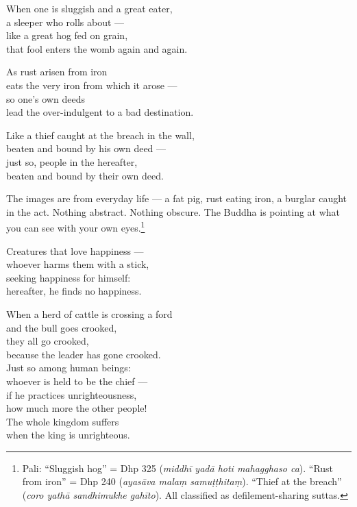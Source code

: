 \begin{versebox}
When one is sluggish and a great eater,\\
a sleeper who rolls about ---\\
like a great hog fed on grain,\\
that fool enters the womb again and again.
\end{versebox}

\begin{versebox}
As rust arisen from iron\\
eats the very iron from which it arose ---\\
so one's own deeds\\
lead the over-indulgent to a bad destination.
\end{versebox}

\begin{versebox}
Like a thief caught at the breach in the wall,\\
beaten and bound by his own deed ---\\
just so, people in the hereafter,\\
beaten and bound by their own deed.
\end{versebox}

\noindent The images are from everyday life --- a fat pig, rust eating iron, a burglar caught in the act. Nothing abstract. Nothing obscure. The Buddha is pointing at what you can see with your own eyes.\footnote{Pali: ``Sluggish hog'' = Dhp 325 (\textit{middhī yadā hoti mahagghaso ca}). ``Rust from iron'' = Dhp 240 (\textit{ayasāva malaṃ samuṭṭhitaṃ}). ``Thief at the breach'' (\textit{coro yathā sandhimukhe gahīto}). All classified as defilement-sharing suttas.}

\begin{versebox}
Creatures that love happiness ---\\
whoever harms them with a stick,\\
seeking happiness for himself:\\
hereafter, he finds no happiness.
\end{versebox}

\begin{versebox}
When a herd of cattle is crossing a ford\\
and the bull goes crooked,\\
they all go crooked,\\
because the leader has gone crooked.\\[6pt]
Just so among human beings:\\
whoever is held to be the chief ---\\
if he practices unrighteousness,\\
how much more the other people!\\
The whole kingdom suffers\\
when the king is unrighteous.
\end{versebox}

